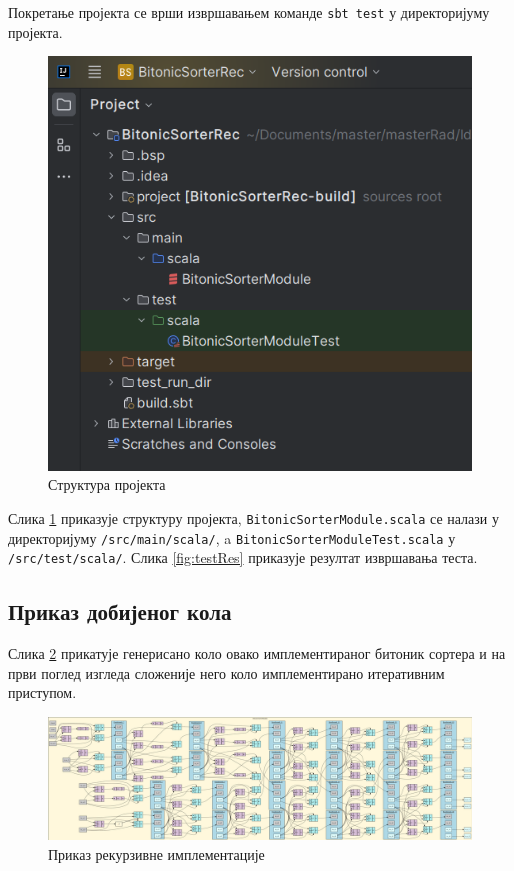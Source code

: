 \documentclass[12pt, a4paper]{article}
\theoremstyle{definition}
\begin{document}
Покретање пројекта се врши извршавањем команде \verb+sbt test+ у директоријуму пројекта.

\begin{figure}[H]
  \centering
      \includegraphics[scale=0.5]{slike/struktura}
  \caption{Структура пројекта}
  \label{fig:struktura}
\end{figure}

Слика \ref{fig:struktura} приказује структуру пројекта, \verb+BitonicSorterModule.scala+ се налази у директоријуму \verb+/src/main/scala/+, a \verb+BitonicSorterModuleTest.scala+ у \verb+/src/test/scala/+.
Слика \ref{fig:testRes} приказује резултат извршавања теста.

\newpage
\subsection{Приказ добијеног кола}

Слика \ref{fig:visualizeRec} прикатује генерисано коло овако имплементираног битоник сортера и на први поглед изгледа сложеније него коло имплементирано итеративним приступом.

\begin{figure}[H]
  \centering
      \includegraphics[scale=0.31]{slike/visualizeRec.png}
  \caption{Приказ рекурзивне имплементације}
  \label{fig:visualizeRec}
\end{figure}
\end{document}
